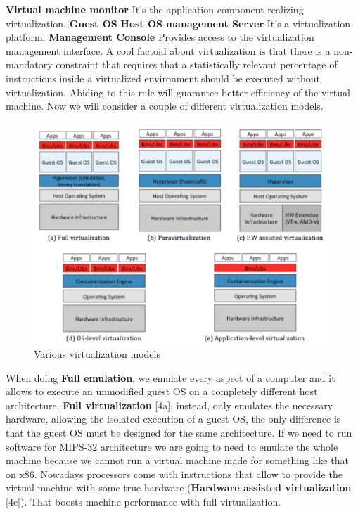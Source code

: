 \smallSpace
\textbf{Virtual machine monitor}\n
It's the application component realizing virtualization. \n
\smallSpace
\textbf{Guest OS} \n
\smallSpace
\textbf{Host OS} \n
\smallSpace
\textbf{management Server} \n
It's a virtualization platform.
\smallSpace
\textbf{Management Console} \n
Provides access to the virtualization management interface. \n
\subSpace
A cool factoid about virtualization is that there is a non-mandatory constraint that requires that a statistically relevant percentage of instructions inside a virtualized environment should be executed without virtualization. Abiding to this rule will guarantee better efficiency of the virtual machine. \n
Now we will consider a couple of different virtualization models. 
\begin{figure}
    \centering
    \includegraphics[scale=0.4]{img/virtualization_stacks.png}
    \caption{Various virtualization models}
\end{figure}
When doing \textbf{Full emulation}, we emulate every aspect of a computer and it allows to execute an unmodified guest OS on a completely different host architecture. \n
\miniSpace
\textbf{Full virtualization} [4a], instead, only emulates the necessary hardware, allowing the isolated execution of a guest OS, the only difference is that the guest OS must be designed for the same architecture. \n
\miniSpace
If we need to run software for MIPS-32 architecture we are going to need to emulate the whole machine because we cannot run a virtual machine made for something like that on x86. \n
\miniSpace
Nowadays processors come with instructions that allow to provide the virtual machine with some true hardware (\textbf{Hardware assisted virtualization} [4c]). That boosts machine performance with full virtualization. \n
